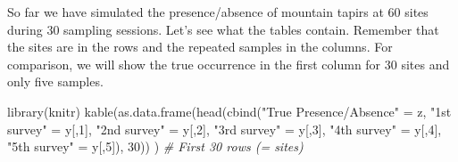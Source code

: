 \documentclass[
]{book}
\newenvironment{Shaded}{\begin{snugshade}}{\end{snugshade}}
\newcommand{\CommentTok}[1]{\textcolor[rgb]{0.56,0.35,0.01}{\textit{#1}}}
\newcommand{\DecValTok}[1]{\textcolor[rgb]{0.00,0.00,0.81}{#1}}
\newcommand{\FunctionTok}[1]{\textcolor[rgb]{0.00,0.00,0.00}{#1}}
\newcommand{\NormalTok}[1]{#1}
\newcommand{\OtherTok}[1]{\textcolor[rgb]{0.56,0.35,0.01}{#1}}
\newcommand{\StringTok}[1]{\textcolor[rgb]{0.31,0.60,0.02}{#1}}
\begin{document}
So far we have simulated the presence/absence of mountain tapirs at 60 sites during 30 sampling sessions. Let's see what the tables contain. Remember that the sites are in the rows and the repeated samples in the columns. For comparison, we will show the true occurrence in the first column for 30 sites and only five samples.

\begin{Shaded}
\begin{Highlighting}[]
\FunctionTok{library}\NormalTok{(knitr)}
\FunctionTok{kable}\NormalTok{(}\FunctionTok{as.data.frame}\NormalTok{(}\FunctionTok{head}\NormalTok{(}\FunctionTok{cbind}\NormalTok{(}\StringTok{"True Presence/Absence"} \OtherTok{=}\NormalTok{ z, }
           \StringTok{"1st survey"} \OtherTok{=}\NormalTok{ y[,}\DecValTok{1}\NormalTok{], }
           \StringTok{"2nd survey"} \OtherTok{=}\NormalTok{ y[,}\DecValTok{2}\NormalTok{], }
           \StringTok{"3rd survey"} \OtherTok{=}\NormalTok{ y[,}\DecValTok{3}\NormalTok{],}
           \StringTok{"4th survey"} \OtherTok{=}\NormalTok{ y[,}\DecValTok{4}\NormalTok{],}
           \StringTok{"5th survey"} \OtherTok{=}\NormalTok{ y[,}\DecValTok{5}\NormalTok{]), }\DecValTok{30}\NormalTok{)) )   }\CommentTok{\# First 30 rows (= sites)}
\end{Highlighting}
\end{Shaded}
\end{document}
